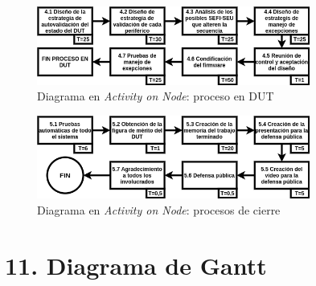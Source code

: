 \documentclass[
11pt, %
]{charter}
\begin{document}
\begin{figure}[htpb]
	\centering 
	\includegraphics[width=0.8\textwidth]{./Figuras/AoN4.png}
	\caption{Diagrama en \textit{Activity on Node}: proceso en DUT}
	\label{fig:AoN4}
\end{figure}

\begin{figure}[htpb]
	\centering 
	\includegraphics[width=0.8\textwidth]{./Figuras/AoN5.png}
	\caption{Diagrama en \textit{Activity on Node}: procesos de cierre}
	\label{fig:AoN5}
\end{figure}

\section{11. Diagrama de Gantt}
\label{sec:gantt}
\end{document}
